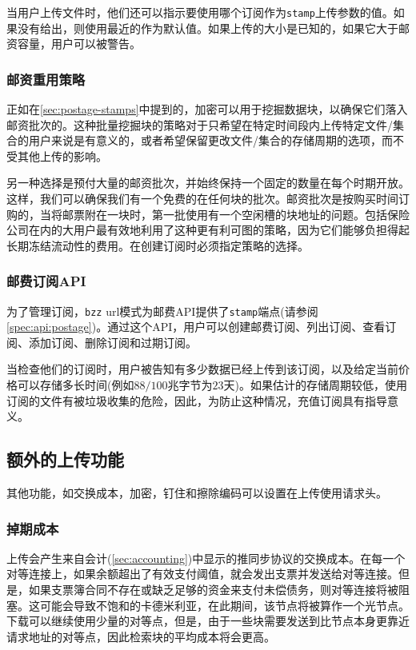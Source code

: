 当用户上传文件时，他们还可以指示要使用哪个订阅作为\lstinline{stamp}上传参数的值。如果没有给出，则使用最近的作为默认值。如果上传的大小是已知的，如果它大于邮资容量，用户可以被警告。 

\subsubsection{邮资重用策略}

正如在\ref{sec:postage-stamps}中提到的，加密可以用于挖掘数据块，以确保它们落入邮资批次的。这种批量挖掘块的策略对于只希望在特定时间段内上传特定文件/集合的用户来说是有意义的，或者希望保留更改文件/集合的存储周期的选项，而不受其他上传的影响。

另一种选择是预付大量的邮资批次，并始终保持一个固定的数量在每个时期开放。这样，我们可以确保我们有一个免费的在任何块的批次。邮资批次是按购买时间订购的，当将邮票附在一块时，第一批使用有一个空闲槽的块地址的问题。包括保险公司在内的大用户最有效地利用了这种更有利可图的策略，因为它们能够负担得起长期冻结流动性的费用。在创建订阅时必须指定策略的选择。

\subsubsection{邮费订阅API}

为了管理订阅，\lstinline{bzz} url模式为邮费API提供了\lstinline{stamp}端点(请参阅\ref{spec:api:postage})。通过这个API，用户可以创建邮费订阅、列出订阅、查看订阅、添加订阅、删除订阅和过期订阅。

当检查他们的订阅时，用户被告知有多少数据已经上传到该订阅，以及给定当前价格可以存储多长时间(例如$88/100$兆字节为$23$天)。如果估计的存储周期较低，使用订阅的文件有被垃圾收集的危险，因此，为防止这种情况，充值订阅具有指导意义。


\subsection{额外的上传功能\statusgreen}\label{sec:features}

其他功能，如交换成本，加密，钉住和擦除编码可以设置在上传使用请求头。 


\subsubsection{掉期成本}

上传会产生来自会计(\ref{sec:accounting})中显示的推同步协议的交换成本。在每一个对等连接上，如果余额超出了有效支付阈值，就会发出支票并发送给对等连接。但是，如果支票簿合同不存在或缺乏足够的资金来支付未偿债务，则对等连接将被阻塞。这可能会导致不饱和的卡德米利亚，在此期间，该节点将被算作一个光节点。下载可以继续使用少量的对等点，但是，由于一些块需要发送到比节点本身更靠近请求地址的对等点，因此检索块的平均成本将会更高。

